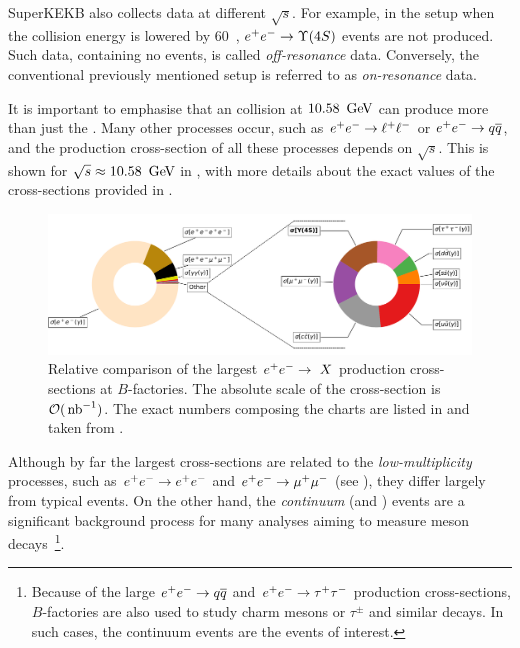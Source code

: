 SuperKEKB also collects data at different $\sqrt{s}$.
For example, in the setup when the collision energy is lowered by 60~\mev, $\epem\ra\FourS$ events are not produced.
Such data, containing no \FourS events, is called \textit{off-resonance} data.
Conversely, the conventional previously mentioned setup is referred to as \textit{on-resonance} data.

It is important to emphasise that an \epem collision at $10.58~\mathrm{\,Ge\kern -0.1em V}$ can produce more than just the \FourS.
Many other processes occur, such as $e^+e^-\rightarrow\ell^+\ell^-$ or $e^+e^-\rightarrow q\overline q$, and the production 
cross-section of all these processes depends on $\sqrt{s}$.
This is shown for \mbox{$\sqrt{s}\approx10.58~\mathrm{\,Ge\kern -0.1em V}$} in , with more details about the exact values of the cross-sections provided in .
\begin{figure}[hbtp!]
    \includegraphics[width=1\textwidth]{figures/experimental_setup/corss_sections.pdf}
    \caption{\label{fig:cross_sections} Relative comparison of the largest $e^+e^-\rightarrow\ X$ production cross-sections at $B$-factories.
    The absolute scale of the cross-section is $\mathcal{O}({\rm \,nb}^{-1})$.
    The exact numbers composing the charts are listed in  and taken from \cite{Belle-II:2018jsg}.
    }
\end{figure}

Although by far the largest cross-sections are related to the \textit{low-multiplicity} processes, 
such as \mbox{$e^+e^-\rightarrow e^+e^-$} and \mbox{$e^+e^-\rightarrow\mu^+\mu^-$} (see ),
they differ largely from typical \mbox{\FourS\ra\BB} events.
On the other hand, the \textit{continuum} (\epem\ra\qqbar and \epem\ra\tautau) 
events are a significant background process for many analyses aiming to measure \B meson decays~\footnote{Because of the large $e^+e^-\rightarrow q\overline q$ and $e^+e^-\rightarrow\tau^+\tau^-$ production cross-sections, 
$B$-factories are also used to study charm mesons or $\tau^{\pm}$ and similar decays. 
In such cases, the continuum events are the events of interest.}.

